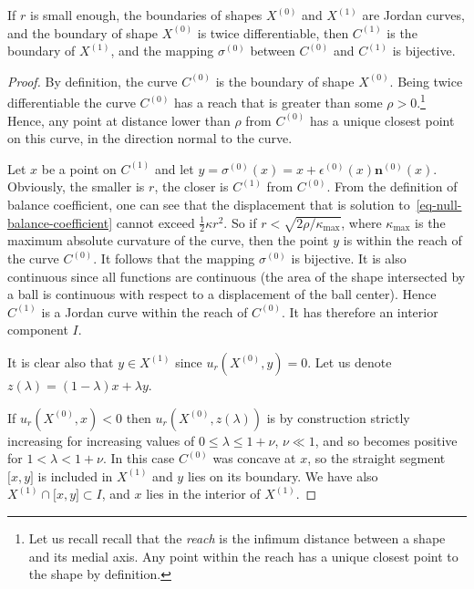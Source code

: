 \documentclass[review]{siamart220329}
\begin{document}
\begin{proposition} \label{prop-C-equ-X}
  If $r$ is small enough, the boundaries of shapes $X^{(0)}$ and
  $X^{(1)}$ are Jordan curves, and the boundary of shape $X^{(0)}$ is
  twice differentiable, then $C^{(1)}$ is the boundary of $X^{(1)}$,
  and the mapping $\sigma^{(0)}$ between $C^{(0)}$ and $C^{(1)}$ is
  bijective.
\end{proposition}
\begin{proof}
  By definition, the curve $C^{(0)}$ is the boundary of shape
  $X^{(0)}$.  Being twice differentiable the curve $C^{(0)}$ has a
  reach that is greater than some $\rho > 0$.\footnote{Let us recall
  recall that the {\em reach} is the infimum distance between a shape
  and its medial axis. Any point within the reach has a unique closest
  point to the shape by definition.} Hence, any point at distance lower than $\rho$
  from $C^{(0)}$ has a unique closest point on this curve, in the
  direction normal to the curve.

  Let $x$ be a point on $C^{(1)}$ and let
  $y=\sigma^{(0)}(x)=x+\epsilon^{(0)}(x) \mathbf{n}^{(0)}(x)$.
  Obviously, the smaller is $r$, the closer is $C^{(1)}$ from
  $C^{(0)}$.  From the definition of balance coefficient, one can see
  that the displacement that is solution to~\cref{eq-null-balance-coefficient} cannot exceed $\frac{1}{2}\kappa
  r^2$. So if $r < \sqrt{2\rho / \kappa_{\max}}$, where
  $\kappa_{\max}$ is the maximum absolute curvature of the curve, then
  the point $y$ is within the reach of the curve $C^{(0)}$. It follows
  that the mapping $\sigma^{(0)}$ is bijective. It is also continuous
  since all functions are continuous (the area of the shape
  intersected by a ball is continuous with respect to a displacement
  of the ball center).  Hence $C^{(1)}$ is a Jordan curve within the
  reach of $C^{(0)}$. It has therefore an interior component $I$.

  It is clear also that $y \in X^{(1)}$ since $u_r(X^{(0)},y)=0$.
  Let us denote $z(\lambda)=(1-\lambda)x+\lambda y$.

  If $u_r(X^{(0)},x)<0$ then $u_r(X^{(0)},z(\lambda))$ is by
  construction strictly increasing for increasing values of $0 \le
  \lambda \le 1+\nu$, $\nu \ll 1$, and so becomes positive for
  $1<\lambda < 1 + \nu$. In this case $C^{(0)}$ was concave at $x$,
  so the straight segment $\lbrack x,y \rbrack$ is included in
  $X^{(1)}$ and $y$ lies on its boundary. We have also $X^{(1)}
  \cap \lbrack x,y \rbrack \subset I$, and $x$ lies in the interior of
  $X^{(1)}$.
  

\end{proof}
\end{document}
